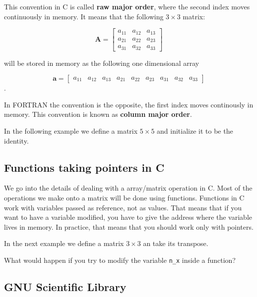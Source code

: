 \documentclass{article}
\begin{document}
This convention in C is called {\bf raw major order}, where the second index moves continuously in memory. It means that the following $3\times 3$ matrix:


\begin{displaymath}
\mathbf{A} = 
\left[
\begin{array}{ccc}
a_{11}  & a_{12} & a_{13}   \\
a_{21}  & a_{22}   & a_{23}  \\
a_{31}  & a_{32} & a_{33}   
\end{array}
\right]
\end{displaymath}

will be stored in memory as the following one dimensional array

\begin{displaymath}
\mathbf{a} = 
\left[
\begin{array}{ccccccccc}
a_{11}  & a_{12} & a_{13}   & a_{21}  & a_{22}   & a_{23}  & a_{31}  & a_{32} & a_{33}   
\end{array}
\right]
\end{displaymath}.

In FORTRAN the convention is the opposite, the first index moves continously in memory. This convention is known as {\bf column major order}. 

In the following example we define a matrix $5\times 5$ and initialize it to be 
the identity.




\subsection{Functions taking pointers in C}
We go into the details of dealing with a array/matrix operation in C. Most of the operations we make onto a matrix will be done using functions. Functions in C work with variables passed as reference, not as values. That means that if you want to have a variable modified, you have to give the address where the variable lives in memory. In practice, that means that you should work only with pointers.


In the next example we define a matrix $3\times3$ an take its transpose.



What would happen if you try to modify the variable \verb"n_x" inside a function?

\subsection{GNU Scientific Library}
\end{document}
